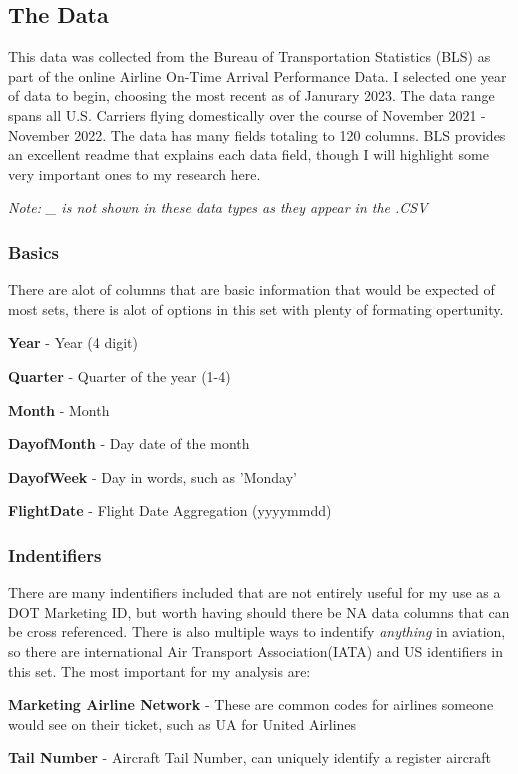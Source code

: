 \documentclass[a4paper,12pt]{article}
\begin{document}
\subsection{The Data} \label{data}
This data was collected from the Bureau of Transportation Statistics (BLS) as part of the online Airline On-Time Arrival Performance Data. 
I selected one year of data to begin, choosing the most recent as of Janurary 2023. The data range spans all U.S. Carriers flying domestically over the course of November 2021 - November 2022.
The data has many fields totaling to 120 columns. BLS provides an excellent readme that explains each data field, though I will highlight some very important ones to my research here.

\emph{Note: \_ is not shown in these data types as they appear in the .CSV}

\subsubsection{Basics}
There are alot of columns that are basic information that would be expected of most sets, there is alot of options in this set with plenty of formating opertunity.

\textbf{Year} - Year (4 digit)

\textbf{Quarter} - Quarter of the year (1-4)

\textbf{Month} - Month

\textbf{DayofMonth} - Day date of the month

\textbf{DayofWeek} - Day in words, such as 'Monday'

\textbf{FlightDate} - Flight Date Aggregation (yyyymmdd)

\subsubsection{Indentifiers}
There are many indentifiers included that are not entirely useful for my use as a DOT Marketing ID, but worth having should there be NA data columns that can be cross referenced.
There is also multiple ways to indentify \emph{anything} in aviation, so there are international Air Transport Association(IATA) and US identifiers in this set.
The most important for my analysis are:

\textbf{Marketing Airline Network} - These are common codes for airlines someone would see on their ticket, such as UA for United Airlines 

\textbf{Tail Number} - Aircraft Tail Number, can uniquely identify a register aircraft
\end{document}

